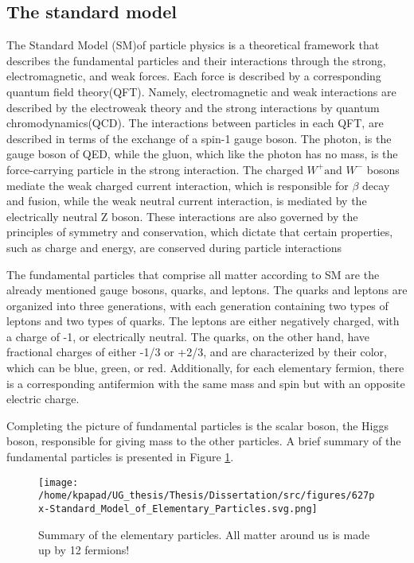 \subsection{The standard model}
\label{sec:org8632faf}

The Standard Model (SM)of particle physics is a theoretical framework that describes the fundamental particles and their interactions through the strong, electromagnetic, and weak forces. Each force is described by a corresponding quantum field theory(QFT). Namely, electromagnetic and weak interactions are described by the electroweak theory and the strong interactions by quantum chromodynamics(QCD). The interactions between particles in each QFT, are described in terms of the exchange of a spin-1 gauge boson. The photon, is the gauge boson of QED, while the gluon, which like the photon has no mass, is the force-carrying particle in the strong interaction. The charged \(W^{+} \text{and }W^{-}\) bosons mediate the weak charged current interaction, which is responsible for \(\beta\) decay and fusion, while the weak neutral current interaction, is mediated by the electrically neutral Z boson. These interactions are also governed by the principles of symmetry and conservation, which dictate that certain properties, such as charge and energy, are conserved during particle interactions

The fundamental particles that comprise all matter according to SM are the already mentioned gauge bosons, quarks, and leptons. The quarks and leptons are organized into three generations, with each generation containing two types of leptons and two types of quarks. The leptons are either negatively charged, with a charge of -1, or electrically neutral. The quarks, on the other hand, have fractional charges of either -1/3 or +2/3, and are characterized by their color, which can be blue, green, or red. Additionally, for each elementary fermion, there is a corresponding antifermion with the same mass and spin but with an opposite electric charge.

Completing the picture of fundamental particles is the scalar boson, the Higgs boson, responsible for giving mass to the other particles. A brief summary of the fundamental particles is presented in Figure \ref{fig:particles}.

\begin{figure}[h]
\centering
\texttt{[image: /home/kpapad/UG\_thesis/Thesis/Dissertation/src/figures/627px-Standard\_Model\_of\_Elementary\_Particles.svg.png]}
\caption{Summary of the elementary particles. All matter around us is made up by 12 fermions!}
\label{fig:particles}
\end{figure}


